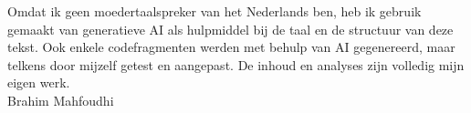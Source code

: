 Omdat ik geen moedertaalspreker van het Nederlands ben, heb ik gebruik gemaakt van generatieve AI als hulpmiddel bij de taal en de structuur van deze tekst. Ook enkele codefragmenten werden met behulp van AI gegenereerd, maar telkens door mijzelf getest en aangepast. De inhoud en analyses zijn volledig mijn eigen werk. \\

Brahim Mahfoudhi











